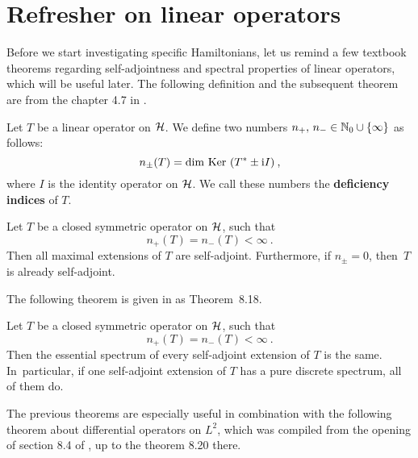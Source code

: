 \section{Refresher on linear operators}
Before we start investigating specific Hamiltonians, let us remind a few textbook theorems regarding self-adjointness and spectral properties of linear operators, which will be useful later. The following definition and the subsequent theorem are from the chapter 4.7 in \citet{BEH}.
\begin{defn}
    \label{defn-deficiency-indices}
    Let $T$ be a linear operator on $\mathcal{H}$. We define two numbers $n_+, \, n_- \in \mathbb{N}_0 \cup \{ \infty \}$ as follows:
    \begin{equation*}
        n_\pm(T) = \mathrm{dim~Ker~} (T^* \pm \mathrm{i} I) \: ,
    \end{equation*}
    where $I$ is the identity operator on $\mathcal{H}$. We call these numbers the \textbf{deficiency indices} of $T$.
\end{defn}
\begin{thm}
    \label{thm-deficiency-self-adj}
    Let $T$ be a closed symmetric operator on $\mathcal{H}$, such that
    \begin{equation*}
        n_+(T) = n_-(T) < \infty \: .
    \end{equation*}
    Then all maximal extensions of $T$ are self-adjoint. Furthermore, if $n_\pm = 0$, then~$T$ is already self-adjoint.
\end{thm}
The following theorem is given in \citet{Weidmann} as Theorem~8.18.
\begin{thm}
    \label{thm-sym-extension-spectrum}
    Let $T$ be a closed symmetric operator on $\mathcal{H}$, such that
    \begin{equation*}
        n_+(T) = n_-(T) < \infty \: .
    \end{equation*}
    Then the essential spectrum of every self-adjoint extension of $T$ is the same. In~particular, if one self-adjoint extension of $T$ has a pure discrete spectrum, all of them do.
\end{thm}
The previous theorems are especially useful in combination with the following theorem about differential operators on $L^2$, which was compiled from the opening of section 8.4 of \citet{Weidmann}, up to the theorem 8.20 there.
